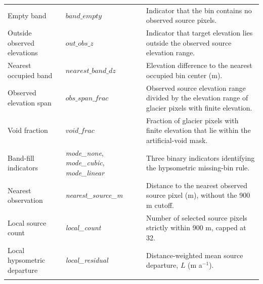 \begin{table}[t]
\begin{tabular}{p{}p{}p{}}
Empty band & $band\_empty$ & Indicator that the bin contains no observed source pixels. \\

\rowcolor[gray]{0.94}
Outside observed elevations & $out\_obs\_z$ & Indicator that target elevation lies outside the observed source elevation range. \\

Nearest occupied band & $nearest\_band\_dz$ & Elevation difference to the nearest occupied bin center (m). \\

\rowcolor[gray]{0.94}
Observed elevation span & $\textit{obs\_span\_frac}$ & Observed source elevation range divided by the elevation range of glacier pixels with finite elevation. \\

Void fraction & $void\_frac$ & Fraction of glacier pixels with finite elevation that lie within the artificial-void mask. \\

\rowcolor[gray]{0.94}
Band-fill indicators & \textit{mode\_none}, \textit{mode\_cubic}, \textit{mode\_linear} & Three binary indicators identifying the hypsometric missing-bin rule. \\

Nearest observation & \textit{nearest\_source\_m} & Distance to the nearest observed source pixel (m), without the 900 m cutoff. \\

\rowcolor[gray]{0.94}
Local source count & \textit{local\_count} & Number of selected source pixels strictly within 900 m, capped at 32. \\

Local hypsometric departure & \textit{local\_residual} & Distance-weighted mean source departure, $L$ (m a$^{-1}$). \\
\bottomhline
\end{tabular}
\end{table}
